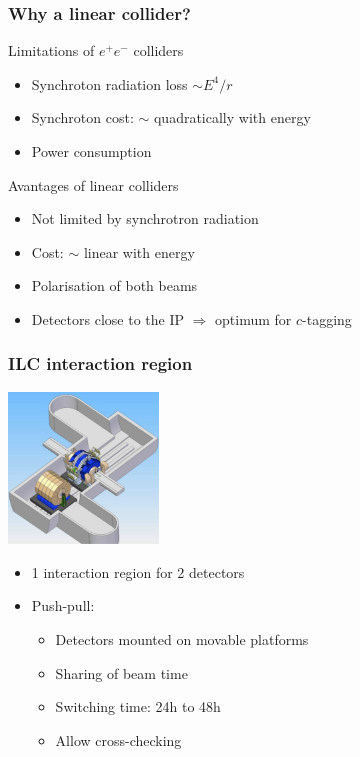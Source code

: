 \documentclass{beamer}
\begin{document}
  \begin{frame}[plain]
    \frametitle{Why a linear collider?}

    \begin{block}{Limitations of $e^+e^-$ colliders}
      \begin{itemize}
        \item Synchroton radiation loss $\sim E^{4}/r$
        \item Synchroton cost: $\sim$ quadratically with energy
        \item Power consumption
      \end{itemize}
    \end{block}
    
    \begin{block}{Avantages of linear colliders}
      \begin{itemize}
        \item Not limited by synchrotron radiation
        \item Cost: $\sim$ linear with energy
        \item Polarisation of both beams
        \item Detectors close to the IP $\Rightarrow$ optimum for $c$-tagging
      \end{itemize}
    \end{block}
  \end{frame}


  \begin{frame}[plain]
    \frametitle{ILC interaction region}

    \begin{center}
      \includegraphics[width = 0.3\textwidth]{Pictures/ILC_Hall.png}
    \end{center}

    \begin{itemize}
      \item 1 interaction region for 2 detectors
      \item Push-pull:
      \begin{itemize}
        \item Detectors mounted on movable platforms
        \item Sharing of beam time
        \item Switching time: 24h to 48h
        \item Allow cross-checking
      \end{itemize}
    \end{itemize}
  \end{frame}
\end{document}
